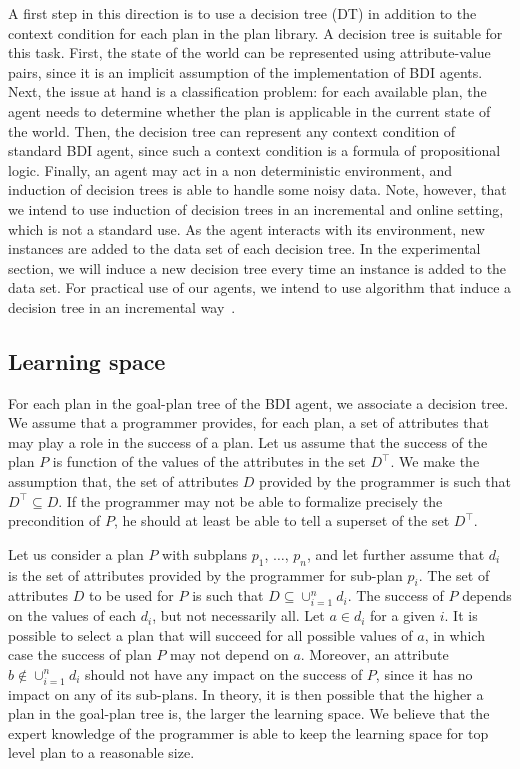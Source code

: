 \documentclass{article}
\begin{document}
A first step in this direction is to use a decision tree (DT) in
addition to the context condition for each plan in the plan library.
A decision tree is suitable for this task.
%
First, the state of the world can be represented using
attribute-value pairs, since it is an implicit assumption of the
implementation of BDI agents.
%
Next, the issue at hand is a classification problem: for each
available plan, the agent needs to determine whether the plan is
applicable in the current state of the world.
%
Then, the decision tree can represent any context condition of
standard BDI agent, since such a context condition is a formula of
propositional logic.
%
Finally, an agent may act in a non deterministic environment, and
induction of decision trees is able to handle some noisy data.
%
Note, however, that we intend to use induction of decision trees in an
incremental and online setting, which is not a standard use.  As the
agent interacts with its environment, new instances are added to the
data set of each decision tree. In the experimental section, we will
induce a new decision tree every time an instance is added to the data
set. For practical use of our agents, we intend to use algorithm that
induce a decision tree in an incremental
way~\cite{Swere06:Fast,Utgoff97Decision}.

\subsection{Learning space}

For each plan in the goal-plan tree of the BDI agent, we associate a
decision tree. We assume that a programmer provides, for each plan, a
set of attributes that may play a role in the success of a plan. Let
us assume that the success of the plan $P$ is function of the values
of the attributes in the set $D^{\top}$. We make the assumption that,
the set of attributes $D$ provided by the programmer is such that
$D^{\top} \subseteq D$. If the programmer may not be able to formalize
precisely the precondition of $P$, he should at least be able to tell
a superset of the set $D^{\top}$.

Let us consider a plan $P$ with subplans $p_1$, $\dots$, $p_n$, and
let further assume that $d_i$ is the set of attributes provided by the
programmer for sub-plan $p_i$. The set of attributes $D$ to be used
for $P$ is such that $D \subseteq \cup_{i=1}^n d_i$. The success of
$P$ depends on the values of each $d_i$, but not necessarily all. Let
$a \in d_i$ for a given $i$. It is possible to select a plan that will
succeed for all possible values of $a$, in which case the success of
plan $P$ may not depend on $a$. Moreover, an attribute $b \notin
\cup_{i=1}^n d_i$ should not have any impact on the success of $P$,
since it has no impact on any of its sub-plans. In theory, it is then
possible that the higher a plan in the goal-plan tree is, the larger
the learning space. We believe that the expert knowledge of the
programmer is able to keep the learning space for top level plan to a
reasonable size.
\end{document}

